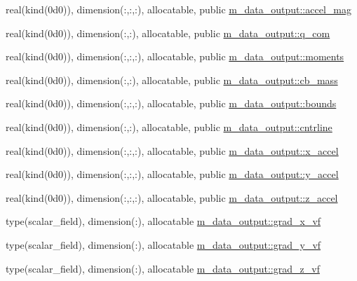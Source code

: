 \begin{DoxyCompactItemize}
\item 
real(kind(0d0)), dimension(\+:,\+:,\+:), allocatable, public \hyperlink{namespacem__data__output_a1ccababc9891f8a719df1c52b49e969a}{m\+\_\+data\+\_\+output\+::accel\+\_\+mag}
\item 
real(kind(0d0)), dimension(\+:,\+:), allocatable, public \hyperlink{namespacem__data__output_ac5b476661d64159fdcd7364715495f30}{m\+\_\+data\+\_\+output\+::q\+\_\+com}
\item 
real(kind(0d0)), dimension(\+:,\+:,\+:), allocatable, public \hyperlink{namespacem__data__output_abd8505e33c0dce0f0aba7e27ae53bef5}{m\+\_\+data\+\_\+output\+::moments}
\item 
real(kind(0d0)), dimension(\+:,\+:), allocatable, public \hyperlink{namespacem__data__output_a775b8128a9261b4d095f9132508d309f}{m\+\_\+data\+\_\+output\+::cb\+\_\+mass}
\item 
real(kind(0d0)), dimension(\+:,\+:,\+:), allocatable, public \hyperlink{namespacem__data__output_a1e7a93a0d32bbc7c691381689771b6f9}{m\+\_\+data\+\_\+output\+::bounds}
\item 
real(kind(0d0)), dimension(\+:,\+:), allocatable, public \hyperlink{namespacem__data__output_a4f2a6c0ed44fb82d337013e700479ce5}{m\+\_\+data\+\_\+output\+::cntrline}
\item 
real(kind(0d0)), dimension(\+:,\+:,\+:), allocatable, public \hyperlink{namespacem__data__output_ac465283e56b508af6500bea1ad4c745c}{m\+\_\+data\+\_\+output\+::x\+\_\+accel}
\item 
real(kind(0d0)), dimension(\+:,\+:,\+:), allocatable, public \hyperlink{namespacem__data__output_a9170ca95f1f4493fd30a48052ed214a7}{m\+\_\+data\+\_\+output\+::y\+\_\+accel}
\item 
real(kind(0d0)), dimension(\+:,\+:,\+:), allocatable, public \hyperlink{namespacem__data__output_aef4cabc25090173d5817782631af2781}{m\+\_\+data\+\_\+output\+::z\+\_\+accel}
\item 
type(scalar\+\_\+field), dimension(\+:), allocatable \hyperlink{namespacem__data__output_a40d8d6be32c01d80e224dcae55f6ee50}{m\+\_\+data\+\_\+output\+::grad\+\_\+x\+\_\+vf}
\item 
type(scalar\+\_\+field), dimension(\+:), allocatable \hyperlink{namespacem__data__output_ac21a93203a6e7e5bc4ffb8c1082440ae}{m\+\_\+data\+\_\+output\+::grad\+\_\+y\+\_\+vf}
\item 
type(scalar\+\_\+field), dimension(\+:), allocatable \hyperlink{namespacem__data__output_a5b33b9c60a91e08f0e67da2de15e7d6d}{m\+\_\+data\+\_\+output\+::grad\+\_\+z\+\_\+vf}

\end{DoxyCompactItemize}
